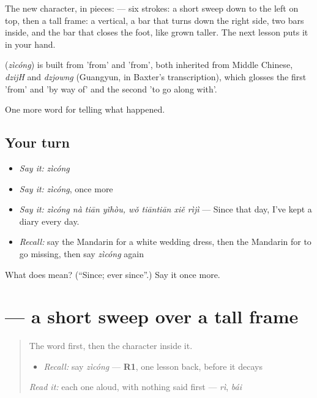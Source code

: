 The new character, in pieces:  — six strokes: a short sweep down to the left on top, then a tall frame: a vertical, a bar that turns down the right side, two bars inside, and the bar that closes the foot, like  grown taller. The next lesson puts it in your hand.

\begin{cousinweb}
\textbf{} (\emph{zìcóng}) is built from  'from' and  'from', both inherited from Middle Chinese, \emph{dzijH} and \emph{dzjowng} (Guangyun, in Baxter's transcription), which glosses the first 'from' and 'by way of' and the second 'to go along with'.
\end{cousinweb}

\begin{grammarlens}[title={What you've built}]
One more word for telling what happened.
\end{grammarlens}

\subsection*{Your turn}
\begin{itemize}
\raggedright
  \item \emph{Say it:} \emph{zìcóng}
  \item \emph{Say it:} \emph{zìcóng}, once more
  \item \emph{Say it:} \emph{zìcóng nà tiān yǐhòu, wǒ tiāntiān xiě rìjì} — Since that day, I've kept a diary every day.
  \item \emph{Recall:} say the Mandarin for a white wedding dress, then the Mandarin for to go missing, then say \emph{zìcóng} again
\end{itemize}

\begin{tcolorbox}[breakable,colback=teal!4,colframe=teal!35!black,title={Before you move on}]
What does  mean? (\textquotedblleft{}Since; ever since\textquotedblright{}.) Say it once more.
\end{tcolorbox}
\section[\texorpdfstring{\zh{自} (zì)}{自 (zì)}]{ — a short sweep over a tall frame}

\label{lesson:ZH-W308-zi-self}



\begin{quote}
The word first, then the character inside it.

\begin{itemize}
\raggedright
  \item \emph{Recall:} say \emph{zìcóng} — \textbf{R1}, one lesson back, before it decays
\end{itemize}

\begin{quote}
 
\end{quote}

\emph{Read it:} each one aloud, with nothing said first — \emph{rì}, \emph{bái}
\end{quote}

